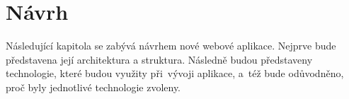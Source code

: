 \chapter{Návrh}
Následující kapitola se zabývá návrhem nové webové aplikace. Nejprve bude představena její architektura a struktura. Následně budou představeny technologie, které budou využity při~vývoji aplikace, a~též bude odůvodněno, proč byly jednotlivé technologie zvoleny.



